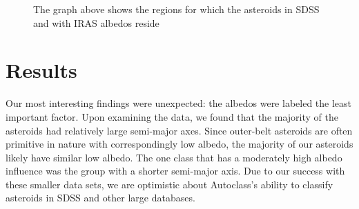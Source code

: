 \documentclass[thesis]{RyanPoster}
\begin{document}
\begin{poster}
\begin{figure}
\begin{center}
\caption{The graph above shows the regions for which the asteroids in SDSS and with IRAS albedos reside}%
\end{center}
\end{figure}

\section{Results}
Our most interesting findings were unexpected: the albedos were labeled the least important factor.  Upon examining the data, we found that the majority of the asteroids had relatively large semi-major axes.  Since outer-belt asteroids are often primitive in nature with correspondingly low albedo, the majority of our asteroids likely have similar low albedo.  The one class that has a moderately high albedo influence was the group with a shorter semi-major axis.  Due to our success with these smaller data sets, we are optimistic about Autoclass's ability to classify asteroids in SDSS and other large databases.  

\end{poster}
\end{document}

